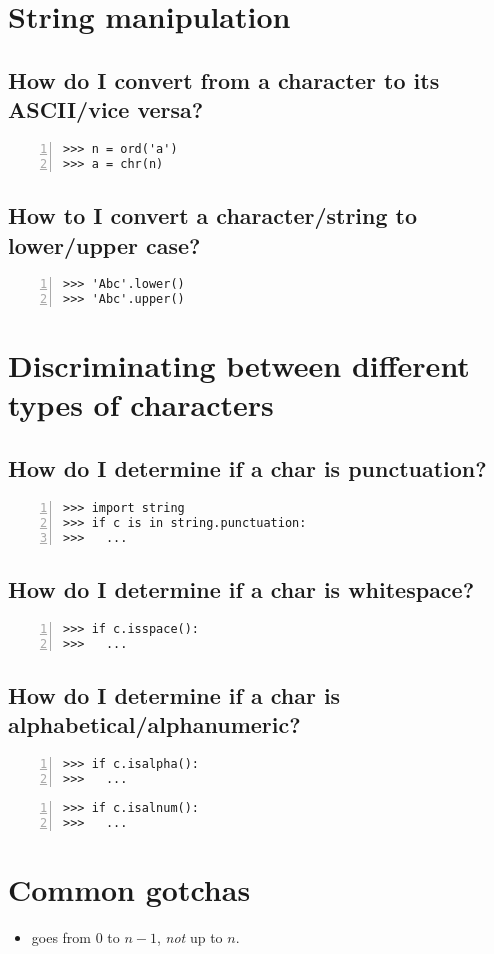 \documentclass[12pt]{article}
\begin{document}
\section{String manipulation}
\subsection{How do I convert from a character to its ASCII/vice versa?}
\begin{lstlisting}[numbers=left]
>>> n = ord('a')
>>> a = chr(n)
\end{lstlisting}

\subsection{How to I convert a character/string to lower/upper case?}
\begin{lstlisting}[numbers=left]
>>> 'Abc'.lower()
>>> 'Abc'.upper()
\end{lstlisting}

\section{Discriminating between different types of characters}
\subsection{How do I determine if a char is punctuation?}
\begin{lstlisting}[numbers=left]
>>> import string
>>> if c is in string.punctuation:
>>>   ...
\end{lstlisting}

\subsection{How do I determine if a char is whitespace?}
\begin{lstlisting}[numbers=left]
>>> if c.isspace():
>>>   ...
\end{lstlisting}

\subsection{How do I determine if a char is alphabetical/alphanumeric?}
\begin{lstlisting}[numbers=left]
>>> if c.isalpha():
>>>   ...
\end{lstlisting}
\begin{lstlisting}[numbers=left]
>>> if c.isalnum():
>>>   ...
\end{lstlisting}

\section{Common gotchas}
\begin{itemize}
\item {} goes from $0$ to $n-1$, \emph{not} up to $n$.
\end{itemize}


%
%
\end{document}
